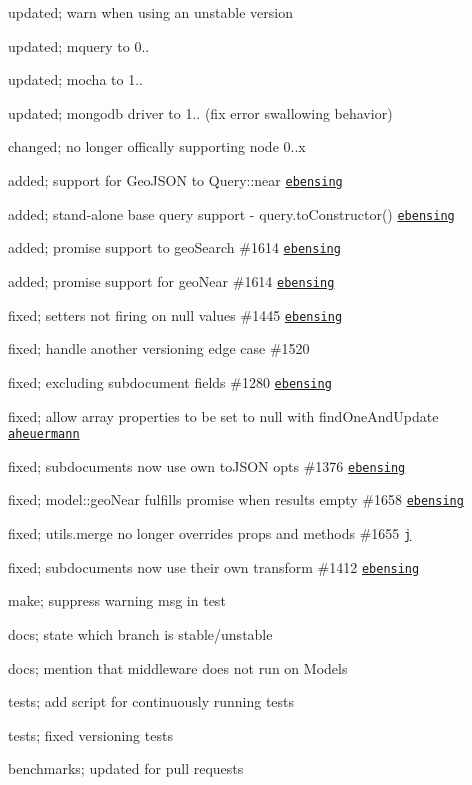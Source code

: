 \begin{DoxyItemize}
\item updated; warn when using an unstable version
\item updated; mquery to 0..
\item updated; mocha to 1..
\item updated; mongodb driver to 1.. (fix error swallowing behavior)
\item changed; no longer offically supporting node 0..\+x
\item added; support for Geo\+J\+S\+ON to Query\+::near \href{https://github.com/ebensing}{\tt ebensing}
\item added; stand-\/alone base query support -\/ query.\+to\+Constructor() \href{https://github.com/ebensing}{\tt ebensing}
\item added; promise support to geo\+Search \#1614 \href{https://github.com/ebensing}{\tt ebensing}
\item added; promise support for geo\+Near \#1614 \href{https://github.com/ebensing}{\tt ebensing}
\item fixed; setters not firing on null values \#1445 \href{https://github.com/ebensing}{\tt ebensing}
\item fixed; handle another versioning edge case \#1520
\item fixed; excluding subdocument fields \#1280 \href{https://github.com/ebensing}{\tt ebensing}
\item fixed; allow array properties to be set to null with find\+One\+And\+Update \href{https://github.com/aheuermann}{\tt aheuermann}
\item fixed; subdocuments now use own to\+J\+S\+ON opts \#1376 \href{https://github.com/ebensing}{\tt ebensing}
\item fixed; model\+::geo\+Near fulfills promise when results empty \#1658 \href{https://github.com/ebensing}{\tt ebensing}
\item fixed; utils.\+merge no longer overrides props and methods \#1655 \href{https://github.com/j}{\tt j}
\item fixed; subdocuments now use their own transform \#1412 \href{https://github.com/ebensing}{\tt ebensing}
\item make; suppress warning msg in test
\item docs; state which branch is stable/unstable
\item docs; mention that middleware does not run on Models
\item tests; add script for continuously running tests
\item tests; fixed versioning tests
\item benchmarks; updated for pull requests
\end{DoxyItemize}

